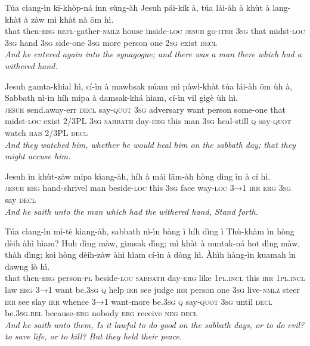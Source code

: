 \documentclass[11pt,a4paper]{article}
\begin{document}
\begin{exe}
\gll Túa cìang-ìn kī-khòp-ná ínn sùng-àh Jesuh pái-kík à, túa lái-àh à khùt à lang-khàt à zàw mì khàt nà ōm hì. \\
     that then-\textsc{erg} \textsc{refl}-gather-\textsc{nmlz} house inside-\textsc{loc} \textsc{jesuh} go-\textsc{iter} \textsc{3sg} that midst-\textsc{loc} \textsc{3sg} hand \textsc{3sg} side-one \textsc{3sg} more person one \textsc{2sg} exist \textsc{decl} \\
\glt \textcolor{kjvcolor}{\textit{And he entered again into the synagogue; and there was a man there which had a withered hand.}}

\gll Jesuh gamta-khial hì, cí-ìn à mawhsak núam mì pàwl-khàt túa lái-àh ōm ùh à, Sabbath nì-ìn híh mipa à damsak-khá hìam, cí-ìn vil gìgè ùh hì. \\
     \textsc{jesuh} send.away-err \textsc{decl} say-\textsc{quot} \textsc{3sg} adversary want person some-one that midst-\textsc{loc} exist 2/3PL \textsc{3sg} \textsc{sabbath} day-\textsc{erg} this man \textsc{3sg} heal-still \textsc{q} say-\textsc{quot} watch \textsc{hab} 2/3PL \textsc{decl} \\
\glt \textcolor{kjvcolor}{\textit{And they watched him, whether he would heal him on the sabbath day; that they might accuse him.}}

\gll Jesuh ìn khùt-zàw mipa kìang-àh, híh à mái lām-àh hòng dìng ìn à cí hì. \\
     \textsc{jesuh} \textsc{erg} hand-shrivel man beside-\textsc{loc} this \textsc{3sg} face way-\textsc{loc} \textsc{3→1} \textsc{irr} \textsc{erg} \textsc{3sg} say \textsc{decl} \\
\glt \textcolor{kjvcolor}{\textit{And he saith unto the man which had the withered hand, Stand forth.}}

\gll Túa cìang-ìn mì-tè kìang-àh, sabbath nì-ìn bàng ì híh dìng ì Thù-khàm ìn hòng dèih àhì hìam? Huh dìng màw, gimsak dìng; mì khàt à nuntak-ná hot dìng màw, thàh dìng; koi hòng dèih-zàw àhì hìam cí-ìn à dòng hì. Àhìh hàng-ìn kuamah ìn dawng lò hì. \\
     that then-\textsc{erg} person-\textsc{pl} beside-\textsc{loc} \textsc{sabbath} day-\textsc{erg} like \textsc{1pl}.\textsc{incl} this \textsc{irr} \textsc{1pl}.\textsc{incl} law \textsc{erg} \textsc{3→1} want be.\textsc{3sg} \textsc{q} help \textsc{irr} see judge \textsc{irr} person one \textsc{3sg} live-\textsc{nmlz} steer \textsc{irr} see slay \textsc{irr} whence \textsc{3→1} want-more be.\textsc{3sg} \textsc{q} say-\textsc{quot} \textsc{3sg} until \textsc{decl} be.\textsc{3sg}.\textsc{rel} because-\textsc{erg} nobody \textsc{erg} receive \textsc{neg} \textsc{decl} \\
\glt \textcolor{kjvcolor}{\textit{And he saith unto them, Is it lawful to do good on the sabbath days, or to do evil? to save life, or to kill? But they held their peace.}}


\end{exe}
\end{document}
